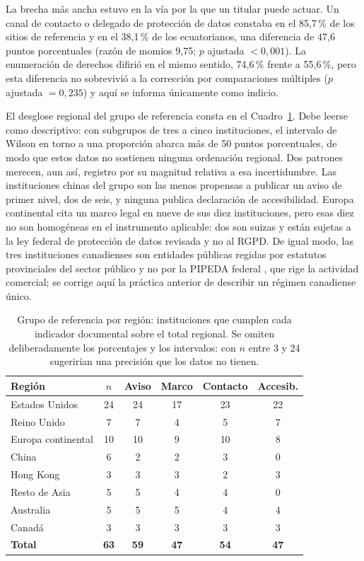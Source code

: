 \documentclass[pdflatex,sn-basic,Numbered]{sn-jnl}
\theoremstyle{thmstyleone}
\theoremstyle{thmstyletwo}
\theoremstyle{thmstylethree}
\begin{document}
La brecha m\'as ancha estuvo en la v\'ia por la que un titular puede actuar. Un canal de contacto o delegado de protecci\'on de datos constaba en el 85,7\,\% de los sitios de referencia y en el 38,1\,\% de los ecuatorianos, una diferencia de 47,6 puntos porcentuales (raz\'on de momios 9,75; $p$ ajustada $<0{,}001$). La enumeraci\'on de derechos difiri\'o en el mismo sentido, 74,6\,\% frente a 55,6\,\%, pero esta diferencia no sobrevivi\'o a la correcci\'on por comparaciones m\'ultiples ($p$ ajustada $=0{,}235$) y aqu\'i se informa \'unicamente como indicio.

El desglose regional del grupo de referencia consta en el Cuadro~\ref{tab:reg}. Debe leerse como descriptivo: con subgrupos de tres a cinco instituciones, el intervalo de Wilson en torno a una proporci\'on abarca m\'as de 50 puntos porcentuales, de modo que estos datos no sostienen ninguna ordenaci\'on regional. Dos patrones merecen, aun as\'i, registro por su magnitud relativa a esa incertidumbre. Las instituciones chinas del grupo son las menos propensas a publicar un aviso de primer nivel, dos de seis, y ninguna publica declaraci\'on de accesibilidad. Europa continental cita un marco legal en nueve de sus diez instituciones, pero esas diez no son homog\'eneas en el instrumento aplicable: dos son suizas y est\'an sujetas a la ley federal de protecci\'on de datos revisada \citep{fadp_ch} y no al RGPD. De igual modo, las tres instituciones canadienses son entidades p\'ublicas regidas por estatutos provinciales del sector p\'ublico \citep{fippa_on,fippa_bc,quebec_privacy} y no por la PIPEDA federal \citep{pipeda2000}, que rige la actividad comercial; se corrige aqu\'i la pr\'actica anterior de describir un r\'egimen canadiense \'unico.

\begin{table}[htbp]
	\centering
	\caption{Grupo de referencia por regi\'on: instituciones que cumplen cada indicador documental sobre el total regional. Se omiten deliberadamente los porcentajes y los intervalos: con $n$ entre 3 y 24 sugerir\'ian una precisi\'on que los datos no tienen.}\label{tab:reg}
	\small
	\begin{tabular}{@{}lccccc@{}}
		\toprule
		\textbf{Regi\'on} & \textbf{$n$} & \textbf{Aviso} & \textbf{Marco} & \textbf{Contacto} & \textbf{Accesib.} \\
		\midrule
		Estados Unidos & 24 & 24 & 17 & 23 & 22 \\
		Reino Unido & 7 & 7 & 4 & 5 & 7 \\
		Europa continental & 10 & 10 & 9 & 10 & 8 \\
		China & 6 & 2 & 2 & 3 & 0 \\
		Hong Kong & 3 & 3 & 3 & 2 & 3 \\
		Resto de Asia & 5 & 5 & 4 & 4 & 0 \\
		Australia & 5 & 5 & 5 & 4 & 4 \\
		Canad\'a & 3 & 3 & 3 & 3 & 3 \\
		\midrule
		\textbf{Total} & \textbf{63} & \textbf{59} & \textbf{47} & \textbf{54} & \textbf{47} \\
		\bottomrule
	\end{tabular}
\end{table}
\end{document}
